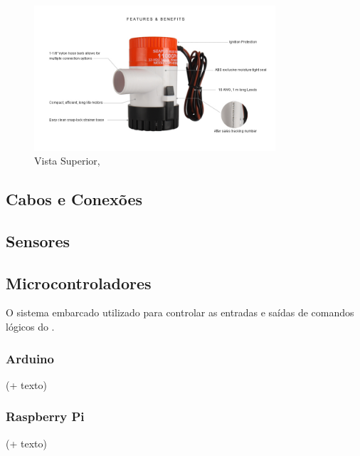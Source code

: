 \begin{figure}[!htb]
	\centering
	\includegraphics[width=0.8\textwidth]{Figures/Rov/Bomba_porao-Seaflo.jpg}
	\caption{Vista Superior, \cite{bombadeporao}}
	\label{fig:bombaporao}
\end{figure}

\subsection{Cabos e Conexões}
\label{sec:caboseconexoes}


\subsection{Sensores}
\label{sec:sensores}

\subsection{Microcontroladores}
\label{sec:microcontroladores}

O sistema embarcado utilizado para controlar as entradas e saídas de comandos lógicos do \rovname.

\subsubsection{Arduino}
\label{sec:arduino}
(+ texto)

\subsubsection{Raspberry Pi}
\label{sec:raspberrypi}
(+ texto)

